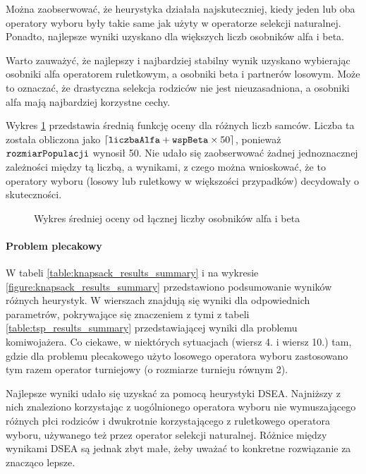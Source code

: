 \documentclass[./FM_mgr.tex]{subfiles}
\begin{document}
Można zaobserwować, że heurystyka działała najskuteczniej, kiedy jeden lub oba operatory wyboru były takie same jak użyty w operatorze selekcji naturalnej.
Ponadto, najlepsze wyniki uzyskano dla większych liczb osobników alfa i beta.

Warto zauważyć, że najlepszy i najbardziej stabilny wynik uzyskano wybierając osobniki alfa operatorem ruletkowym, a osobniki beta i partnerów losowym.
Może to oznaczać, że drastyczna selekcja rodziców nie jest nieuzasadniona, a osobniki alfa mają najbardziej korzystne cechy.

Wykres \ref{figure:tsp_male_avg} przedstawia średnią funkcję oceny dla różnych liczb samców.
Liczba ta została obliczona jako $\lceil \mathtt{liczbaAlfa} + \mathtt{wspBeta} \times 50 \rceil$, ponieważ $\mathtt{rozmiarPopulacji}$ wynosił 50.
Nie udało się zaobserwować żadnej jednoznacznej zależności między tą liczbą, a wynikami, z czego można wnioskować, że to operatory wyboru (losowy lub ruletkowy w większości przypadków) decydowały o skuteczności.

\newpage

\begin{figure}[H]
	\caption{Wykres średniej oceny od łącznej liczby osobników alfa i beta \label{figure:tsp_male_avg}}
	\centering
\end{figure}

\paragraph{Problem plecakowy}

W tabeli \ref{table:knapsack_results_summary} i na wykresie \ref{figure:knapsack_results_summary} przedstawiono podsumowanie wyników różnych heurystyk. 
W wierszach znajdują się wyniki dla odpowiednich parametrów, pokrywające się znaczeniem z tymi z tabeli \ref{table:tsp_results_summary} przedstawiającej wyniki dla problemu komiwojażera.
Co ciekawe, w niektórych sytuacjach (wiersz 4. i wiersz 10.) tam, gdzie dla problemu plecakowego użyto losowego operatora wyboru zastosowano tym razem operator turniejowy (o rozmiarze turnieju równym 2).

Najlepsze wyniki udało się uzyskać za pomocą heurystyki DSEA. 
Najniższy z nich znaleziono korzystając z uogólnionego operatora wyboru nie wymuszającego różnych płci rodziców i dwukrotnie korzystającego z ruletkowego operatora wyboru, używanego też przez operator selekcji naturalnej.
Różnice między wynikami DSEA są jednak zbyt małe, żeby uważać to konkretne rozwiązanie za znacząco lepsze.
\end{document}
